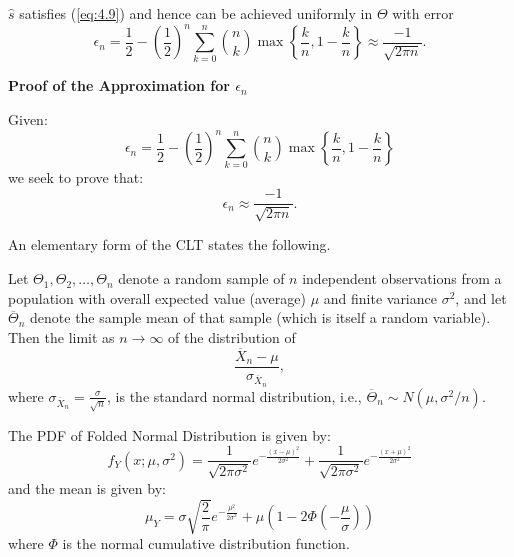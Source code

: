 \documentclass[11pt]{article}
\numberwithin{equation}{section}
\theoremstyle{boldStyle}
\begin{document}
$\hat{s}$ satisfies (\ref{eq:4.9}) and hence can be achieved uniformly in $\Theta$ with error
\[
    \epsilon_n =  \frac{1}{2} - \left(\frac{1}{2}\right)^n \sum_{k=0}^n \binom{n}{k} \max \left\{ \frac{k}{n}, 1 - \frac{k}{n} \right\} \approx \frac{-1}{\sqrt{2\pi n}}.
\]

\bigbreak
\bigbreak

\textbf{Proof of the Approximation for $\epsilon_n$}

Given:
\[
    \epsilon_n =  \frac{1}{2} - \left(\frac{1}{2}\right)^n \sum_{k=0}^n \binom{n}{k} \max \left\{ \frac{k}{n}, 1 - \frac{k}{n} \right\}
\]
we seek to prove that:
\[
    \epsilon_n \approx \frac{-1}{\sqrt{2\pi n}}.
\]


An elementary form of the CLT states the following. 

Let \(\Theta_1, \Theta_2, \dots, \Theta_n\) denote a random sample of \(n\) independent observations 
from a population with overall expected value (average) \(\mu\) and finite variance \(\sigma^2\), and let \(\overline{\Theta}_n\) denote the 
sample mean of that sample (which is itself a random variable). Then the limit as \(n \to \infty\) of the distribution of
\[
\frac{\overline{X}_n - \mu}{\sigma_{\overline{X}_n}},
\]
where \(\sigma_{\overline{X}_n} = \frac{\sigma}{\sqrt{n}}\), is the standard normal distribution, 
i.e., \( \overline{\Theta}_n \sim N(\mu, \sigma^2/n) \).

\bigbreak

The PDF of Folded Normal Distribution is given by:
\[
    f_{Y}(x; \mu, \sigma^2) = \frac{1}{\sqrt{2\pi \sigma^2}} e^{-\frac{(x - \mu)^2}{2\sigma^2}} + \frac{1}{\sqrt{2\pi \sigma^2}} e^{-\frac{(x + \mu)^2}{2\sigma^2}}
\]
and the mean is given by:
\[
    \mu_{Y} = \sigma \sqrt{\frac{2}{\pi}} e^{-\frac{\mu^2}{2\sigma^2}} + \mu \left(1 - 2 \Phi\left(-\frac{\mu}{\sigma}\right)\right)
\]
where $\Phi$ is the normal cumulative distribution function.

\bigbreak
\end{document}
